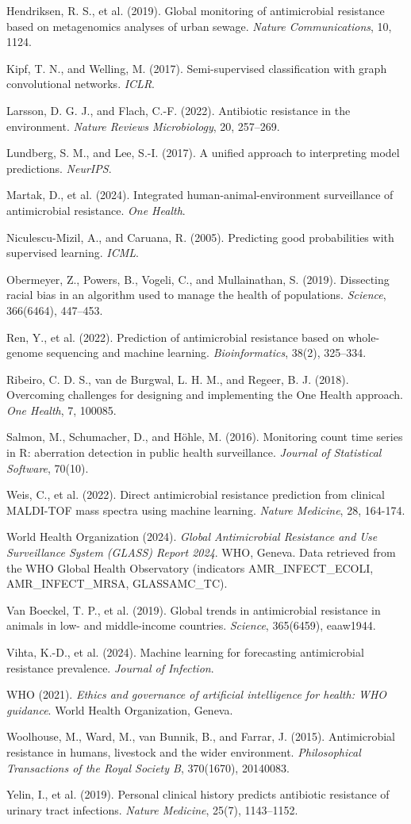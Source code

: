 \documentclass[11pt,a4paper]{article}
\begin{document}
Hendriksen, R. S., et al. (2019). Global monitoring of antimicrobial resistance based on metagenomics analyses of urban sewage. \emph{Nature Communications}, 10, 1124.

Kipf, T. N., and Welling, M. (2017). Semi-supervised classification with graph convolutional networks. \emph{ICLR}.

Larsson, D. G. J., and Flach, C.-F. (2022). Antibiotic resistance in the environment. \emph{Nature Reviews Microbiology}, 20, 257–269.

Lundberg, S. M., and Lee, S.-I. (2017). A unified approach to interpreting model predictions. \emph{NeurIPS}.

Martak, D., et al. (2024). Integrated human-animal-environment surveillance of antimicrobial resistance. \emph{One Health}.

Niculescu-Mizil, A., and Caruana, R. (2005). Predicting good probabilities with supervised learning. \emph{ICML}.

Obermeyer, Z., Powers, B., Vogeli, C., and Mullainathan, S. (2019). Dissecting racial bias in an algorithm used to manage the health of populations. \emph{Science}, 366(6464), 447–453.

Ren, Y., et al. (2022). Prediction of antimicrobial resistance based on whole-genome sequencing and machine learning. \emph{Bioinformatics}, 38(2), 325–334.

Ribeiro, C. D. S., van de Burgwal, L. H. M., and Regeer, B. J. (2018). Overcoming challenges for designing and implementing the One Health approach. \emph{One Health}, 7, 100085.

Salmon, M., Schumacher, D., and Höhle, M. (2016). Monitoring count time series in R: aberration detection in public health surveillance. \emph{Journal of Statistical Software}, 70(10).

Weis, C., et al. (2022). Direct antimicrobial resistance prediction from clinical MALDI-TOF mass spectra using machine learning. \emph{Nature Medicine}, 28, 164-174.

World Health Organization (2024). \emph{Global Antimicrobial Resistance and Use Surveillance System (GLASS) Report 2024}. WHO, Geneva. Data retrieved from the WHO Global Health Observatory (indicators AMR\_INFECT\_ECOLI, AMR\_INFECT\_MRSA, GLASSAMC\_TC).

Van Boeckel, T. P., et al. (2019). Global trends in antimicrobial resistance in animals in low- and middle-income countries. \emph{Science}, 365(6459), eaaw1944.

Vihta, K.-D., et al. (2024). Machine learning for forecasting antimicrobial resistance prevalence. \emph{Journal of Infection}.

WHO (2021). \emph{Ethics and governance of artificial intelligence for health: WHO guidance}. World Health Organization, Geneva.

Woolhouse, M., Ward, M., van Bunnik, B., and Farrar, J. (2015). Antimicrobial resistance in humans, livestock and the wider environment. \emph{Philosophical Transactions of the Royal Society B}, 370(1670), 20140083.

Yelin, I., et al. (2019). Personal clinical history predicts antibiotic resistance of urinary tract infections. \emph{Nature Medicine}, 25(7), 1143–1152.
\end{document}
